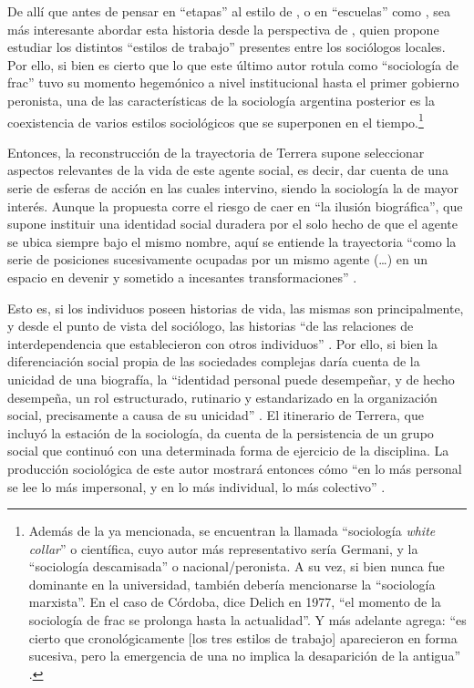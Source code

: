 De allí que antes de pensar en \enquote{etapas} al estilo de \textcite{1681-GERMANI1964}, o en \enquote{escuelas} como \textcite{1703-MARSAL1963}, sea más interesante abordar esta historia desde la perspectiva de \textcite{1613-DELICH1977}, quien propone estudiar los distintos \enquote{estilos de trabajo} presentes entre los sociólogos locales. Por ello, si bien es cierto que lo que este último autor rotula como \enquote{sociología de frac} tuvo su momento hegemónico a nivel institucional hasta el primer gobierno peronista, una de las características de la sociología argentina posterior es la coexistencia de varios estilos sociológicos que se superponen en el tiempo.\footnote{Además de la ya mencionada, se encuentran la llamada \enquote{sociología \emph{white collar}} o científica, cuyo autor más representativo sería Germani, y la \enquote{sociología descamisada} o nacional/peronista. A su vez, si bien nunca fue dominante en la universidad, también debería mencionarse la \enquote{sociología marxista}. En el caso de Córdoba, dice Delich en 1977, \enquote{el momento de la sociología de frac se prolonga hasta la actualidad}. Y más adelante agrega: \enquote{es cierto que cronológicamente [los tres estilos de trabajo] aparecieron en forma sucesiva, pero la emergencia de una no implica la desaparición de la antigua} \parencite[28]{1613-DELICH1977}.}

Entonces, la reconstrucción de la trayectoria de Terrera supone seleccionar aspectos relevantes de la vida de este agente social, es decir, dar cuenta de una serie de esferas de acción en las cuales intervino, siendo la sociología la de mayor interés. Aunque la propuesta corre el riesgo de caer en \enquote{la ilusión biográfica}, que supone instituir una identidad social duradera por el solo hecho de que el agente se ubica siempre bajo el mismo nombre, aquí se entiende la trayectoria \enquote{como la serie de posiciones sucesivamente ocupadas por un mismo agente (\dots) en un espacio en devenir y sometido a incesantes transformaciones} \parencite[127]{1578-BOURDIEU2011}.

Esto es, si los individuos poseen historias de vida, las mismas son principalmente, y desde el punto de vista del sociólogo, las historias \enquote{de las relaciones de interdependencia que establecieron con otros individuos} \parencite[47]{1696-LAHIRE2016}. Por ello, si bien la diferenciación social propia de las sociedades complejas daría cuenta de la unicidad de una biografía, la \enquote{identidad personal puede desempeñar, y de hecho desempeña, un rol estructurado, rutinario y estandarizado en la organización social, precisamente a causa de su unicidad} \parencite[79]{1678-GOFFMANN2010}. El itinerario de Terrera, que incluyó la estación de la sociología, da cuenta de la persistencia de un grupo social que continuó con una determinada forma de ejercicio de la disciplina. La producción sociológica de este autor mostrará entonces cómo \enquote{en lo más personal se lee lo más impersonal, y en lo más individual, lo más colectivo} \parencite[165]{1697-LAHIRE2006}.

